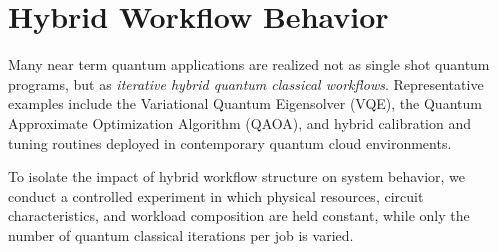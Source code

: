 \section{Hybrid Workflow Behavior}
\label{sec:hybrid-workflow-behavior}

Many near term quantum applications are realized not as single shot quantum programs, but as \emph{iterative hybrid quantum classical workflows}. Representative examples include the Variational Quantum Eigensolver (VQE), the Quantum Approximate Optimization Algorithm (QAOA), and hybrid calibration and tuning routines deployed in contemporary quantum cloud environments.

To isolate the impact of hybrid workflow structure on system behavior, we conduct a controlled experiment in which physical resources, circuit characteristics, and workload composition are held constant, while only the number of quantum classical iterations per job is varied.

